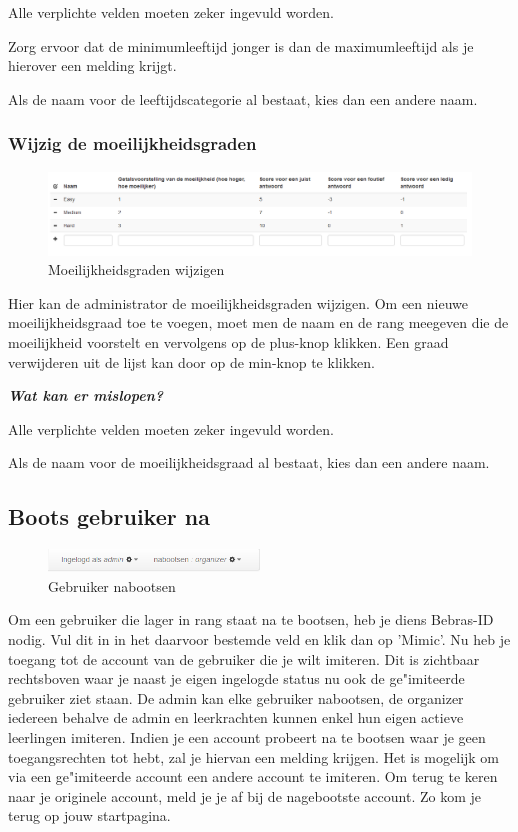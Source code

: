 \documentclass[]{article}
\begin{document}
Alle verplichte velden moeten zeker ingevuld worden.

Zorg ervoor dat de minimumleeftijd jonger is dan de maximumleeftijd als je hierover een melding krijgt.

Als de naam voor de leeftijdscategorie al bestaat, kies dan een andere naam.

\subsubsection{Wijzig de moeilijkheidsgraden}

\begin{figure}[!ht]
	\centering
	\includegraphics[width=1\textwidth]{img/difficulty}
	\caption{Moeilijkheidsgraden wijzigen}
	\label{difficulty}
\end{figure}

Hier kan de administrator de moeilijkheidsgraden wijzigen. Om een nieuwe moeilijkheidsgraad toe te voegen, moet men de naam en de rang meegeven die de moeilijkheid voorstelt en vervolgens op de plus-knop klikken. Een graad verwijderen uit de lijst kan door op de min-knop te klikken.

\textbf{\textit{Wat kan er mislopen?}}

Alle verplichte velden moeten zeker ingevuld worden.

Als de naam voor de moeilijkheidsgraad al bestaat, kies dan een andere naam.

\subsection{Boots gebruiker na}

\begin{figure}[!ht]
	\centering
	\includegraphics[width=0.5\textwidth]{img/mimic}
	\caption{Gebruiker nabootsen}
	\label{mimic}
\end{figure}

Om een gebruiker die lager in rang staat na te bootsen, heb je diens Bebras-ID nodig. Vul dit in in het daarvoor bestemde veld en klik dan op 'Mimic'. Nu heb je toegang tot de account van de gebruiker die je wilt imiteren. Dit is zichtbaar rechtsboven waar je naast je eigen ingelogde status nu ook de ge"imiteerde gebruiker ziet staan. De admin kan elke gebruiker nabootsen, de organizer iedereen behalve de admin en leerkrachten kunnen enkel hun eigen actieve leerlingen imiteren. Indien je een account probeert na te bootsen waar je geen toegangsrechten tot hebt, zal je hiervan een melding krijgen. Het is mogelijk om via een ge"imiteerde account een andere account te imiteren. Om terug te keren naar je originele account, meld je je af bij de nagebootste account. Zo kom je terug op jouw startpagina. 
\end{document}
